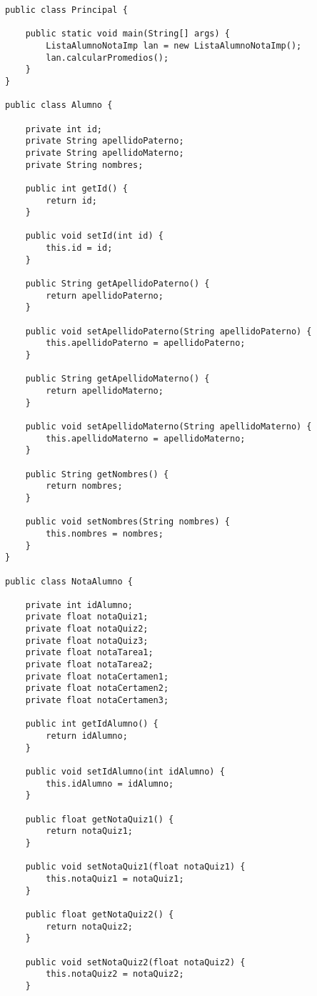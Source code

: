 \documentclass[10pt]{article}
\begin{document}
     \newpage
\begin{verbatim}
public class Principal {

    public static void main(String[] args) {
        ListaAlumnoNotaImp lan = new ListaAlumnoNotaImp();
        lan.calcularPromedios();
    }
}

public class Alumno {

    private int id;
    private String apellidoPaterno;
    private String apellidoMaterno;
    private String nombres;

    public int getId() {
        return id;
    }

    public void setId(int id) {
        this.id = id;
    }

    public String getApellidoPaterno() {
        return apellidoPaterno;
    }

    public void setApellidoPaterno(String apellidoPaterno) {
        this.apellidoPaterno = apellidoPaterno;
    }

    public String getApellidoMaterno() {
        return apellidoMaterno;
    }

    public void setApellidoMaterno(String apellidoMaterno) {
        this.apellidoMaterno = apellidoMaterno;
    }

    public String getNombres() {
        return nombres;
    }

    public void setNombres(String nombres) {
        this.nombres = nombres;
    }
}

public class NotaAlumno {

    private int idAlumno;
    private float notaQuiz1;
    private float notaQuiz2;
    private float notaQuiz3;
    private float notaTarea1;
    private float notaTarea2;
    private float notaCertamen1;
    private float notaCertamen2;
    private float notaCertamen3;

    public int getIdAlumno() {
        return idAlumno;
    }

    public void setIdAlumno(int idAlumno) {
        this.idAlumno = idAlumno;
    }

    public float getNotaQuiz1() {
        return notaQuiz1;
    }

    public void setNotaQuiz1(float notaQuiz1) {
        this.notaQuiz1 = notaQuiz1;
    }

    public float getNotaQuiz2() {
        return notaQuiz2;
    }

    public void setNotaQuiz2(float notaQuiz2) {
        this.notaQuiz2 = notaQuiz2;
    }


\end{verbatim}
\end{document}
